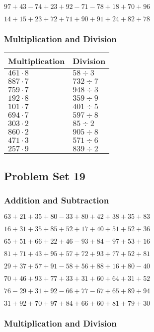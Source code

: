 \(97+43-74+23+92-71-78+18+70+96\)

\(14+15+23+72+71+90+91+24+82+78\)

\hypertarget{multiplication-and-division-17}{%
\subsubsection{Multiplication and
Division}\label{multiplication-and-division-17}}

\begin{longtable}[]{@{}ll@{}}
\toprule
Multiplication & Division\tabularnewline
\midrule
\endhead
\(461\cdot8\) & \(58÷3\)\tabularnewline
\(887\cdot7\) & \(732÷7\)\tabularnewline
\(759\cdot7\) & \(948÷3\)\tabularnewline
\(192\cdot8\) & \(359÷9\)\tabularnewline
\(101\cdot7\) & \(401÷5\)\tabularnewline
\(694\cdot7\) & \(597÷8\)\tabularnewline
\(303\cdot2\) & \(85÷2\)\tabularnewline
\(860\cdot2\) & \(905÷8\)\tabularnewline
\(471\cdot3\) & \(571÷6\)\tabularnewline
\(257\cdot9\) & \(839÷2\)\tabularnewline
\bottomrule
\end{longtable}

\hypertarget{problem-set-19}{%
\subsection{Problem Set 19}\label{problem-set-19}}

\hypertarget{addition-and-subtraction-18}{%
\subsubsection{Addition and
Subtraction}\label{addition-and-subtraction-18}}

\(63+21+35+80-33+80+42+38+35+83\)

\(16+31+35+85+52+17+40+51+52+36\)

\(65+51+66+22+46-93+84-97+53+16\)

\(81+71+43+95+57+72+93+77+52+81\)

\(29+37+57+91-58+56+88+16+80-40\)

\(70+46+93+77+33+31+60+64+31+52\)

\(76-29+31+92-66+77-67+65+89+94\)

\(31+92+70+97+84+66+60+81+79+30\)

\hypertarget{multiplication-and-division-18}{%
\subsubsection{Multiplication and
Division}\label{multiplication-and-division-18}}


